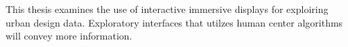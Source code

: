
This thesis examines the use of interactive immersive displays for
exploiring urban design data. Exploratory interfaces that utilzes
human center algorithms will convey more information.

